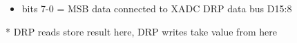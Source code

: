 \begin{itemize}
\item bits 7-0 = MSB data connected to XADC DRP data bus D15:8
\end{itemize}
* DRP reads store result here, DRP writes take value from here

